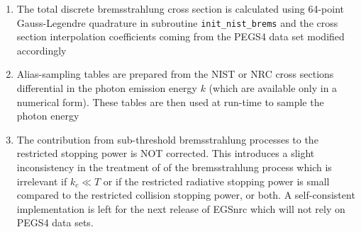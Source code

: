 \begin{enumerate}
\item
The total discrete bremsstrahlung cross section is 
calculated using 64-point Gauss-Legendre quadrature in 
subroutine {\tt init\_nist\_brems} and the cross section 
interpolation coefficients coming from the PEGS4 data set 
modified accordingly
\item
Alias-sampling tables are prepared from the NIST or NRC cross sections 
differential in the photon emission energy $k$ (which are 
available only in a numerical form). These tables are then 
used at run-time to sample the photon energy
\item
The contribution from sub-threshold bremsstrahlung processes to 
the restricted stopping power is NOT corrected. This introduces 
a slight inconsistency in the treatment of of the bremsstrahlung 
process which is irrelevant if $k_c \ll T$ or if 
the restricted radiative stopping power is small compared to 
the restricted collision stopping power, or both. 
A self-consistent implementation is left for the next release 
of EGSnrc which will not rely on PEGS4 data sets.
\end{enumerate}
 

